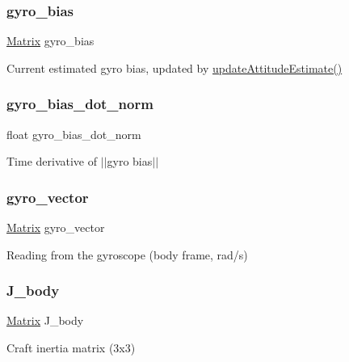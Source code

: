 \subsubsection{\texorpdfstring{gyro\_bias}{gyro\_bias}}
{\footnotesize\ttfamily \mbox{\hyperlink{struct___matrix}{Matrix}} gyro\+\_\+bias}

Current estimated gyro bias, updated by \mbox{\hyperlink{_attitude_estimation_8h_a5aec64402f3df1a6482b514b354f46b0}{update\+Attitude\+Estimate()}} \mbox{\label{struct_a_c_s_type_ad98a2f8a4a88a5e48b648bf1d56494cc}} 
\subsubsection{\texorpdfstring{gyro\_bias\_dot\_norm}{gyro\_bias\_dot\_norm}}
{\footnotesize\ttfamily float gyro\+\_\+bias\+\_\+dot\+\_\+norm}

Time derivative of $\vert$$\vert$gyro bias$\vert$$\vert$ \mbox{\label{struct_a_c_s_type_a6db622f43cefd0fe0f05ddbb5553ce71}} 
\subsubsection{\texorpdfstring{gyro\_vector}{gyro\_vector}}
{\footnotesize\ttfamily \mbox{\hyperlink{struct___matrix}{Matrix}} gyro\+\_\+vector}

Reading from the gyroscope (body frame, rad/s) \mbox{\label{struct_a_c_s_type_ae9005a98c5e356c3c718057fb431215a}} 
\subsubsection{\texorpdfstring{J\_body}{J\_body}}
{\footnotesize\ttfamily \mbox{\hyperlink{struct___matrix}{Matrix}} J\+\_\+body}

Craft inertia matrix (3x3) \mbox{\label{struct_a_c_s_type_a347bdaa887a9c2a386f0785e238f1823}} 
